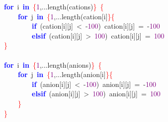 \noindent
\mbox{}\textbf{\textcolor{Blue}{for}}\ i\ \textbf{\textcolor{Blue}{in}}\ \textcolor{Red}{\{}\textcolor{Purple}{1}\textcolor{BrickRed}{,...}length\textcolor{BrickRed}{(}cations\textcolor{BrickRed}{)}\textcolor{Red}{\}}\ \textcolor{Red}{\{} \\
\mbox{}\ \ \ \ \textbf{\textcolor{Blue}{for}}\ j\ \textbf{\textcolor{Blue}{in}}\ \textcolor{Red}{\{}\textcolor{Purple}{1}\textcolor{BrickRed}{,...}length\textcolor{BrickRed}{(}cation\textcolor{BrickRed}{[}i\textcolor{BrickRed}{]}\textcolor{Red}{\}\{} \\
\mbox{}\ \ \ \ \ \ \ \ \textbf{\textcolor{Blue}{if}}\ \textcolor{BrickRed}{(}cation\textcolor{BrickRed}{[}i\textcolor{BrickRed}{][}j\textcolor{BrickRed}{]}\ \textcolor{BrickRed}{\textless{}}\ \textcolor{BrickRed}{-}\textcolor{Purple}{100}\textcolor{BrickRed}{)}\ cation\textcolor{BrickRed}{[}i\textcolor{BrickRed}{][}j\textcolor{BrickRed}{]}\ \textcolor{BrickRed}{=}\ \textcolor{BrickRed}{-}\textcolor{Purple}{100} \\
\mbox{}\ \ \ \ \ \ \ \ \textbf{\textcolor{Blue}{elsif}}\ \textcolor{BrickRed}{(}cation\textcolor{BrickRed}{[}i\textcolor{BrickRed}{][}j\textcolor{BrickRed}{]}\ \textcolor{BrickRed}{\textgreater{}}\ \textcolor{Purple}{100}\textcolor{BrickRed}{)}\ cation\textcolor{BrickRed}{[}i\textcolor{BrickRed}{][}j\textcolor{BrickRed}{]}\ \textcolor{BrickRed}{=}\ \textcolor{Purple}{100} \\
\mbox{}\textcolor{Red}{\}} \\
\mbox{} \\
\mbox{}\textbf{\textcolor{Blue}{for}}\ i\ \textbf{\textcolor{Blue}{in}}\ \textcolor{Red}{\{}\textcolor{Purple}{1}\textcolor{BrickRed}{,...}length\textcolor{BrickRed}{(}anions\textcolor{BrickRed}{)}\textcolor{Red}{\}}\ \textcolor{Red}{\{} \\
\mbox{}\ \ \ \ \textbf{\textcolor{Blue}{for}}\ j\ \textbf{\textcolor{Blue}{in}}\ \textcolor{Red}{\{}\textcolor{Purple}{1}\textcolor{BrickRed}{,...}length\textcolor{BrickRed}{(}anion\textcolor{BrickRed}{[}i\textcolor{BrickRed}{]}\textcolor{Red}{\}\{} \\
\mbox{}\ \ \ \ \ \ \ \ \textbf{\textcolor{Blue}{if}}\ \textcolor{BrickRed}{(}anion\textcolor{BrickRed}{[}i\textcolor{BrickRed}{][}j\textcolor{BrickRed}{]}\ \textcolor{BrickRed}{\textless{}}\ \textcolor{BrickRed}{-}\textcolor{Purple}{100}\textcolor{BrickRed}{)}\ anion\textcolor{BrickRed}{[}i\textcolor{BrickRed}{][}j\textcolor{BrickRed}{]}\ \textcolor{BrickRed}{=}\ \textcolor{BrickRed}{-}\textcolor{Purple}{100} \\
\mbox{}\ \ \ \ \ \ \ \ \textbf{\textcolor{Blue}{elsif}}\ \textcolor{BrickRed}{(}anion\textcolor{BrickRed}{[}i\textcolor{BrickRed}{][}j\textcolor{BrickRed}{]}\ \textcolor{BrickRed}{\textgreater{}}\ \textcolor{Purple}{100}\textcolor{BrickRed}{)}\ anion\textcolor{BrickRed}{[}i\textcolor{BrickRed}{][}j\textcolor{BrickRed}{]}\ \textcolor{BrickRed}{=}\ \textcolor{Purple}{100} \\
\mbox{}\ \ \ \ \textcolor{Red}{\}} \\
\mbox{}\textcolor{Red}{\}} \\
\mbox{}
